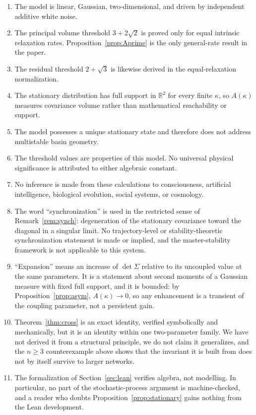 \documentclass[11pt]{article}
\theoremstyle{plain}
\theoremstyle{remark}
\begin{document}
\begin{enumerate}\itemsep2pt
\item The model is linear, Gaussian, two-dimensional, and driven by independent additive white
  noise.
\item The principal volume threshold $3+2\sqrt2$ is proved only for equal intrinsic relaxation
  rates. Proposition~\ref{prop:Aprime} is the only general-rate result in the paper.
\item The residual threshold $2+\sqrt3$ is likewise derived in the equal-relaxation
  normalization.
\item The stationary distribution has full support in $\mathbb{R}^2$ for every finite $\kappa$,
  so $A(\kappa)$ measures covariance volume rather than mathematical reachability or support.
\item The model possesses a unique stationary state and therefore does not address multistable
  basin geometry.
\item The threshold values are properties of this model. No universal physical significance is
  attributed to either algebraic constant.
\item No inference is made from these calculations to consciousness, artificial intelligence,
  biological evolution, social systems, or cosmology.
\item The word ``synchronization'' is used in the restricted sense of
  Remark~\ref{rem:synch}: degeneration of the stationary covariance toward the diagonal in a
  singular limit. No trajectory-level or stability-theoretic synchronization statement is made
  or implied, and the master-stability framework is not applicable to this system.
\item ``Expansion'' means an increase of $\det\Sigma$ relative to its uncoupled value at the
  same parameters. It is a statement about second moments of a Gaussian measure with fixed full
  support, and it is bounded: by Proposition~\ref{prop:asym}, $A(\kappa)\to0$, so any
  enhancement is a transient of the coupling parameter, not a persistent gain.
\item Theorem~\ref{thm:cross} is an exact identity, verified symbolically and mechanically, but
  it is an identity within one two-parameter family. We have not derived it from a structural
  principle, we do not claim it generalizes, and the $n\ge3$ counterexample above shows that
  the invariant it is built from does not by itself survive to larger networks.
\item The formalization of Section~\ref{sec:lean} verifies algebra, not modelling. In
  particular, no part of the stochastic-process argument is machine-checked, and a reader who
  doubts Proposition~\ref{prop:stationary} gains nothing from the Lean development.
\end{enumerate}
\end{document}
